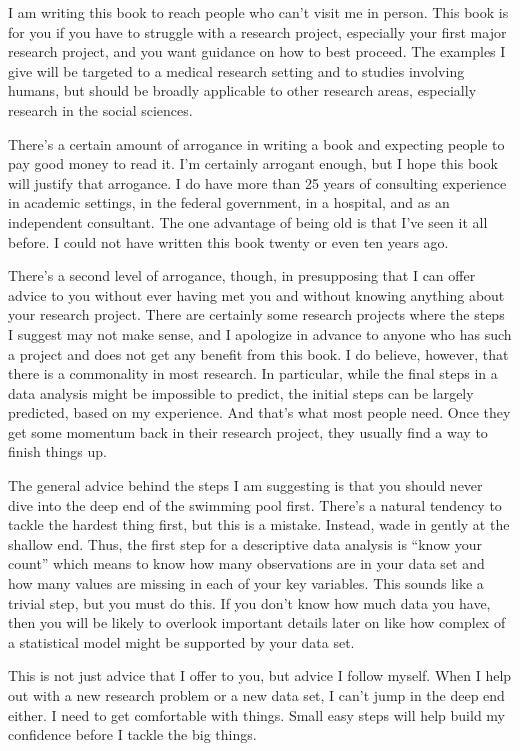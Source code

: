 \documentclass[
  letterpaper,
  DIV=11,
  numbers=noendperiod]{scrreprt}
\begin{document}
I am writing this book to reach people who can't visit me in person.
This book is for you if you have to struggle with a research project,
especially your first major research project, and you want guidance on
how to best proceed. The examples I give will be targeted to a medical
research setting and to studies involving humans, but should be broadly
applicable to other research areas, especially research in the social
sciences.

There's a certain amount of arrogance in writing a book and expecting
people to pay good money to read it. I'm certainly arrogant enough, but
I hope this book will justify that arrogance. I do have more than 25
years of consulting experience in academic settings, in the federal
government, in a hospital, and as an independent consultant. The one
advantage of being old is that I've seen it all before. I could not have
written this book twenty or even ten years ago.

There's a second level of arrogance, though, in presupposing that I can
offer advice to you without ever having met you and without knowing
anything about your research project. There are certainly some research
projects where the steps I suggest may not make sense, and I apologize
in advance to anyone who has such a project and does not get any benefit
from this book. I do believe, however, that there is a commonality in
most research. In particular, while the final steps in a data analysis
might be impossible to predict, the initial steps can be largely
predicted, based on my experience. And that's what most people need.
Once they get some momentum back in their research project, they usually
find a way to finish things up.

The general advice behind the steps I am suggesting is that you should
never dive into the deep end of the swimming pool first. There's a
natural tendency to tackle the hardest thing first, but this is a
mistake. Instead, wade in gently at the shallow end. Thus, the first
step for a descriptive data analysis is ``know your count'' which means
to know how many observations are in your data set and how many values
are missing in each of your key variables. This sounds like a trivial
step, but you must do this. If you don't know how much data you have,
then you will be likely to overlook important details later on like how
complex of a statistical model might be supported by your data set.

This is not just advice that I offer to you, but advice I follow myself.
When I help out with a new research problem or a new data set, I can't
jump in the deep end either. I need to get comfortable with things.
Small easy steps will help build my confidence before I tackle the big
things.
\end{document}
